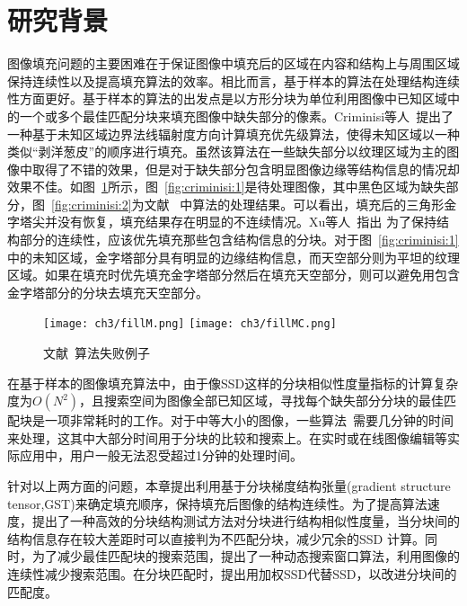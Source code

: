  \section{研究背景}
 \label{ch3:sec:background}
 图像填充问题的主要困难在于保证图像中填充后的区域在内容和结构上与周围区域保持连续性以及提高填充算法的效率。相比而言，基于样本的算法在处理结构连续性方面更好。基于样本的算法的出发点是以方形分块为单位利用图像中已知区域中的一个或多个最佳匹配分块来填充图像中缺失部分的像素。Criminisi等人~\cite{Criminisi04regionfilling}提出了一种基于未知区域边界法线辐射度方向计算填充优先级算法，使得未知区域以一种类似``剥洋葱皮''的顺序进行填充。虽然该算法在一些缺失部分以纹理区域为主的图像中取得了不错的效果，但是对于缺失部分包含明显图像边缘等结构信息的情况却效果不佳。如图~\ref{fig:criminisi}所示，图~\ref{fig:criminisi:1}是待处理图像，其中黑色区域为缺失部分，图~\ref{fig:criminisi:2}为文献~ 中算法的处理结果。可以看出，填充后的三角形金字塔尖并没有恢复，填充结果存在明显的不连续情况。Xu等人~\cite{Xu:2010}指出 为了保持结构部分的连续性，应该优先填充那些包含结构信息的分块。对于图~\ref{fig:criminisi:1}中的未知区域，金字塔部分具有明显的边缘结构信息，而天空部分则为平坦的纹理区域。如果在填充时优先填充金字塔部分然后在填充天空部分，则可以避免用包含金字塔部分的分块去填充天空部分。\par
 \begin{figure}[htb]
   \centering%
     {\texttt{[image: ch3/fillM.png]}}%
  \hspace{1em}%
       {\texttt{[image: ch3/fillMC.png]}}
   \caption{文献~算法失败例子}
   \label{fig:criminisi}
 \end{figure}
 在基于样本的图像填充算法中，由于像SSD这样的分块相似性度量指标的计算复杂度为$O(N^2)$，且搜索空间为图像全部已知区域，寻找每个缺失部分分块的最佳匹配块是一项非常耗时的工作。对于中等大小的图像，一些算法~\cite{Xu:2010}需要几分钟的时间来处理，这其中大部分时间用于分块的比较和搜索上。在实时或在线图像编辑等实际应用中，用户一般无法忍受超过1分钟的处理时间。\par
 针对以上两方面的问题，本章提出利用基于分块梯度结构张量(gradient structure tensor,GST)来确定填充顺序，保持填充后图像的结构连续性。为了提高算法速度，提出了一种高效的分块结构测试方法对分块进行结构相似性度量，当分块间的结构信息存在较大差距时可以直接判为不匹配分块，减少冗余的SSD 计算。同时，为了减少最佳匹配块的搜索范围，提出了一种动态搜索窗口算法，利用图像的连续性减少搜索范围。在分块匹配时，提出用加权SSD代替SSD，以改进分块间的匹配度。
